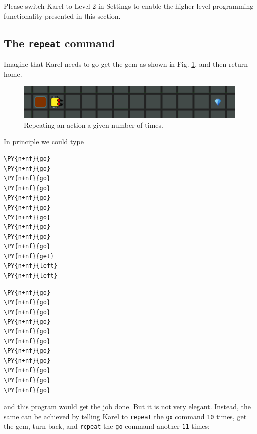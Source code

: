\noindent
Please switch Karel to Level 2 in Settings to enable the higher-level 
programming functionality presented in this section.

\subsection{The {\tt repeat} command}

Imagine that Karel needs to go get the gem as shown in 
Fig. \ref{fig:counting-11}, and then return home. 

\begin{figure}[!ht]
\begin{center}
\includegraphics[width=12.2cm]{img/counting-11.png}
\vspace{-0mm}
\caption{Repeating an action a given number of times.}
\label{fig:counting-11}
\end{center}
\end{figure}

\noindent
In principle we could type\\

\begin{bbox}
\begin{Verbatim}[commandchars=\\\{\}]
\PY{n+nf}{go}
\PY{n+nf}{go}
\PY{n+nf}{go}
\PY{n+nf}{go}
\PY{n+nf}{go}
\PY{n+nf}{go}
\PY{n+nf}{go}
\PY{n+nf}{go}
\PY{n+nf}{go}
\PY{n+nf}{go}
\PY{n+nf}{get}
\PY{n+nf}{left}
\PY{n+nf}{left}
\end{Verbatim}
\end{bbox}
\vspace{6mm}


\begin{bbox}
\begin{Verbatim}[commandchars=\\\{\}]
\PY{n+nf}{go}
\PY{n+nf}{go}
\PY{n+nf}{go}
\PY{n+nf}{go}
\PY{n+nf}{go}
\PY{n+nf}{go}
\PY{n+nf}{go}
\PY{n+nf}{go}
\PY{n+nf}{go}
\PY{n+nf}{go}
\PY{n+nf}{go}
\end{Verbatim}
\end{bbox}
\vspace{6mm}

\noindent
and this program would get the job done. But it is not very elegant. 
Instead, the same can be achieved by telling Karel to {\tt repeat} the {\tt go} 
command {\tt 10} times, get the gem, turn back, and  {\tt repeat} the {\tt go} 
command another {\tt 11} times:\\

